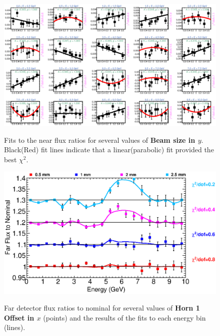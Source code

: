\begin{figure}[ht]
  \begin{center}
    {\includegraphics[width=5.0in]{figures/BeamSigmaY_near_fits.eps}}
  \end{center}
\caption{ Fits to the near flux ratios for several values of {\bf Beam size in $y$}. Black(Red) fit lines indicate that a linear(parabolic) fit provided the best $\chi^2$. }
\end{figure}

\clearpage

\begin{figure}[ht]
  \begin{center}
    {\includegraphics[width=6.0in]{figures/Horn1XOffset_far_summary.eps}}
  \end{center}
\caption{ Far detector flux ratios to nominal for several values of {\bf Horn 1 Offset in $x$} (points) and the results of the fits to each energy bin (lines).}
\end{figure}

